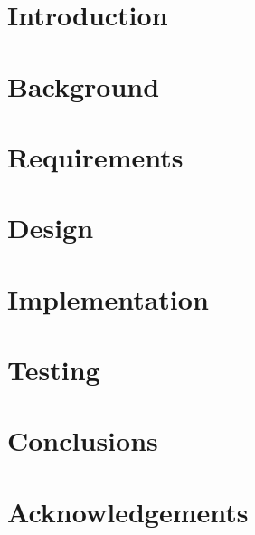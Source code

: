 \documentclass[12pt, twoside]{report}
\begin{document}
  

  \newpage
  \thispagestyle{empty}
  \mbox{}
  \newpage

  \setcounter{page}{1}
  

  \clearpage
    \printglossaries
  \clearpage

  \tableofcontents
  \clearpage

  \chapter{Introduction} \label{introduction}
    

  \chapter{Background} \label{background}
    

  \chapter{Requirements} \label{requirements}
    

  \chapter{Design} \label{design}
    

  \chapter{Implementation} \label{implementation}
    

  \chapter{Testing} \label{testing}
    

  \chapter{Conclusions} \label{conclusions}
    

  \chapter*{Acknowledgements} \label{acknowledgements}
    
\end{document}
